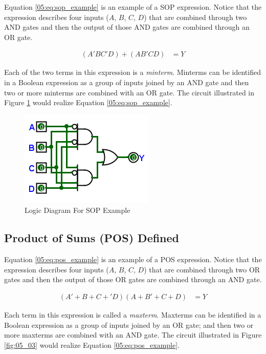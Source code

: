 Equation \ref{05:eq:sop_example} is an example of a \ac{SOP} expression. Notice that the expression describes four inputs ($ A $, $ B $, $ C $, $ D $) that are combined through two \textsf{AND} gates and then the output of those \textsf{AND} gates are combined through an \textsf{OR} gate. 

\begin{align}
  \label{05:eq:sop_example}
  (A'BC'D)+(AB'CD) &= Y
\end{align}

Each of the two terms in this expression is a \emph{minterm}. Minterms can be identified in a Boolean expression as a group of inputs joined by an \textsf{AND} gate and then two or more minterms are combined with an \textsf{OR} gate. The circuit illustrated in Figure \ref{fig:05_02} would realize Equation \ref{05:eq:sop_example}.

\begin{figure}[H]
	\centering
	\includegraphics[width=\maxwidth{.95\linewidth}]{gfx/05_02}
	\caption{Logic Diagram For SOP Example}
	\label{fig:05_02}
\end{figure}

\subsection{Product of Sums (POS) Defined}
\label{05:subsec:product_of_sums_pos_defined}

Equation \ref{05:eq:pos_example} is an example of a \ac{POS} expression. Notice that the expression describes four inputs ($ A $, $ B $, $ C $, $ D $) that are combined through two \textsf{OR} gates and then the output of those \textsf{OR} gates are combined through an \textsf{AND} gate. 

\begin{align}
  \label{05:eq:pos_example}
  (A'+B+C+'D)(A+B'+C+D) &= Y
\end{align}

Each term in this expression is called a \emph{maxterm}. Maxterms can be identified in a Boolean expression as a group of inputs joined by an \textsf{OR} gate; and then two or more maxterms are combined with an \textsf{AND} gate. The circuit illustrated in Figure \ref{fig:05_03} would realize Equation \ref{05:eq:pos_example}. 


